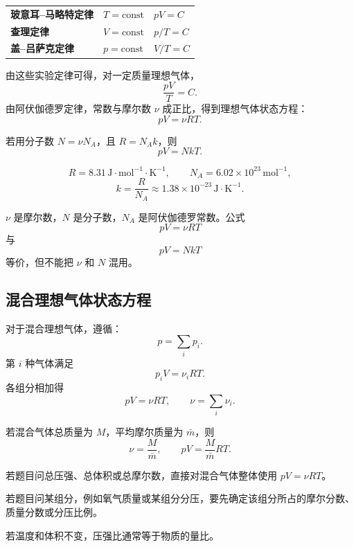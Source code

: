 \begin{FormulaBox}[三条气体实验定律]
\begin{tabularx}{\textwidth}{@{}>{\bfseries}lXX@{}}
玻意耳--马略特定律 & \(T=\mathrm{const}\) & \(pV=C\)\\
查理定律 & \(V=\mathrm{const}\) & \(p/T=C\)\\
盖--吕萨克定律 & \(p=\mathrm{const}\) & \(V/T=C\)\\
\end{tabularx}
\end{FormulaBox}

由这些实验定律可得，对一定质量理想气体，
\[
  \frac{pV}{T}=C.
\]
由阿伏伽德罗定律，常数与摩尔数 \(\nu\) 成正比，得到理想气体状态方程：
\[
  \boxed{pV=\nu RT}.
\]

若用分子数 \(N=\nu N_A\)，且 \(R=N_A k\)，则
\[
  \boxed{pV=NkT}.
\]

\begin{FormulaBox}[常数]
\[
  R=8.31\,\mathrm{J\cdot mol^{-1}\cdot K^{-1}},
  \qquad
  N_A=6.02\times 10^{23}\,\mathrm{mol^{-1}},
\]
\[
  k=\frac{R}{N_A}
  \approx 1.38\times 10^{-23}\,\mathrm{J\cdot K^{-1}}.
\]
\end{FormulaBox}

\begin{WarnBox}[易错点：\(\nu\)、\(N\)、\(N_A\)]
\(\nu\) 是摩尔数，\(N\) 是分子数，\(N_A\) 是阿伏伽德罗常数。公式
\[
  pV=\nu RT
\]
与
\[
  pV=NkT
\]
等价，但不能把 \(\nu\) 和 \(N\) 混用。
\end{WarnBox}

\subsection{混合理想气体状态方程}

对于混合理想气体，遵循：
\[
  p=\sum_i p_i.
\]
第 \(i\) 种气体满足
\[
  p_iV=\nu_i RT.
\]
各组分相加得
\[
  \boxed{pV=\nu RT},
  \qquad
  \nu=\sum_i\nu_i.
\]

若混合气体总质量为 \(M\)，平均摩尔质量为 \(\bar m\)，则
\[
  \nu=\frac{M}{\bar m},
  \qquad
  pV=\frac{M}{\bar m}RT.
\]

\begin{MethodBox}[混合理想气体题的做法]
\begin{ReviewList}
  \item 若题目问总压强、总体积或总摩尔数，直接对混合气体整体使用 \(pV=\nu RT\)。
  \item 若题目问某组分，例如氧气质量或某组分分压，要先确定该组分所占的摩尔分数、质量分数或分压比例。
  \item 若温度和体积不变，压强比通常等于物质的量比。
\end{ReviewList}
\end{MethodBox}

